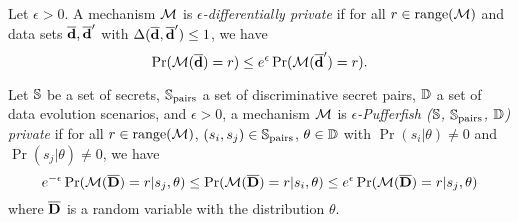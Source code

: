 


\begin{definition}
  Let $\epsilon > 0$. A mechanism $\mathcal{M}$ is
  \emph{$\epsilon$-differentially private} if for all $r \in
  \textmd{range}(\mathcal{M})$ and data sets $\overline{\mathbf{d}}, \overline{\mathbf{d}}'$ with $\Delta (\overline{\mathbf{d}},
  \overline{\mathbf{d}}') \leq 1$, we have
  \[
    \Pr (\mathcal{M} (\overline{\mathbf{d}}) = r) \leq e^{\epsilon} \Pr (\mathcal{M} (\overline{\mathbf{d}}') = r).
  \]
\end{definition}


\begin{definition}
  Let $\mathbb{S}$ be a set of secrets, $\mathbb{S}_{\textmd{pairs}}$ a set of
  discriminative secret pairs, $\mathbb{D}$ a set of data evolution
  scenarios, and $\epsilon > 0$, a mechanism $\mathcal{M}$ is
  \emph{$\epsilon$-Pufferfish ($\mathbb{S}$, $\mathbb{S}_{\textmd{pairs}}$,
    $\mathbb{D}$) private} if for all $r \in \textmd{range}(\mathcal{M})$, $(s_i, s_j) \in
    \mathbb{S}_{\textmd{pairs}}$, $\theta \in \mathbb{D}$ with $\Pr (s_i |
    \theta) \neq 0$ and $\Pr (s_j | \theta) \neq 0$, we have
    \[
      e^{-\epsilon} \Pr (\mathcal{M} (\overline{\mathbf{D}}) = r | s_j, \theta) \leq
      \Pr (\mathcal{M} (\overline{\mathbf{D}}) = r | s_i, \theta) \leq
      e^\epsilon \Pr (\mathcal{M} (\overline{\mathbf{D}}) = r | s_j, \theta)
    \]
    where $\overline{\mathbf{D}}$ is a random variable with the distribution $\theta$.
\end{definition}


  